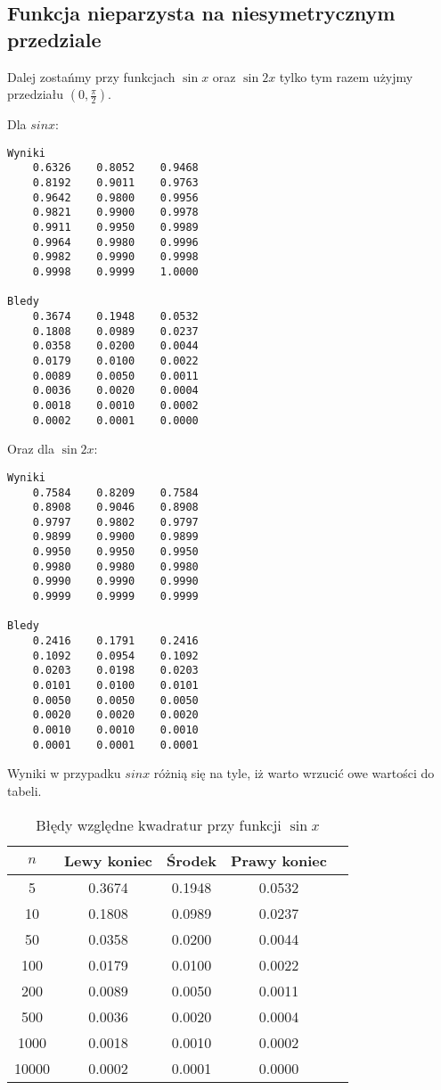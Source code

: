\documentclass[12pt]{article}
\begin{document}
\subsection{Funkcja nieparzysta na niesymetrycznym przedziale}

Dalej zostańmy przy funkcjach $\sin{x}$ oraz $\sin{2x}$ tylko tym razem użyjmy przedziału $(0, \frac{\pi}{2})$.

Dla $sin{x}$:

\begin{lstlisting}
Wyniki
    0.6326    0.8052    0.9468
    0.8192    0.9011    0.9763
    0.9642    0.9800    0.9956
    0.9821    0.9900    0.9978
    0.9911    0.9950    0.9989
    0.9964    0.9980    0.9996
    0.9982    0.9990    0.9998
    0.9998    0.9999    1.0000

Bledy
    0.3674    0.1948    0.0532
    0.1808    0.0989    0.0237
    0.0358    0.0200    0.0044
    0.0179    0.0100    0.0022
    0.0089    0.0050    0.0011
    0.0036    0.0020    0.0004
    0.0018    0.0010    0.0002
    0.0002    0.0001    0.0000
\end{lstlisting}

Oraz dla $\sin{2x}$:

\begin{lstlisting}
Wyniki
    0.7584    0.8209    0.7584
    0.8908    0.9046    0.8908
    0.9797    0.9802    0.9797
    0.9899    0.9900    0.9899
    0.9950    0.9950    0.9950
    0.9980    0.9980    0.9980
    0.9990    0.9990    0.9990
    0.9999    0.9999    0.9999

Bledy
    0.2416    0.1791    0.2416
    0.1092    0.0954    0.1092
    0.0203    0.0198    0.0203
    0.0101    0.0100    0.0101
    0.0050    0.0050    0.0050
    0.0020    0.0020    0.0020
    0.0010    0.0010    0.0010
    0.0001    0.0001    0.0001
\end{lstlisting}

Wyniki w przypadku $sin{x}$ różnią się na tyle, iż warto wrzucić owe wartości do tabeli.

\begin{table}[h!]
\caption{\footnotesize Błędy względne kwadratur przy funkcji $\sin{x}$} %
\renewcommand{\arraystretch}{1.1}
\centering\begin{tabular}{|c|c|c|c|c|}
\hline $n$ & Lewy koniec & Środek & Prawy koniec \\
\hline      5 & 0.3674 & 0.1948 & 0.0532 \\
\hline     10 & 0.1808 & 0.0989 & 0.0237 \\
\hline     50 & 0.0358 & 0.0200 & 0.0044 \\
\hline    100 & 0.0179 & 0.0100 & 0.0022 \\
\hline    200 & 0.0089 & 0.0050 & 0.0011 \\
\hline    500 & 0.0036 & 0.0020 & 0.0004 \\
\hline   1000 & 0.0018 & 0.0010 & 0.0002 \\
\hline  10000 & 0.0002 & 0.0001 & 0.0000 \\
\hline
\end{tabular}
\label{Tabela z wynikami 1}
\end{table}
\end{document}
